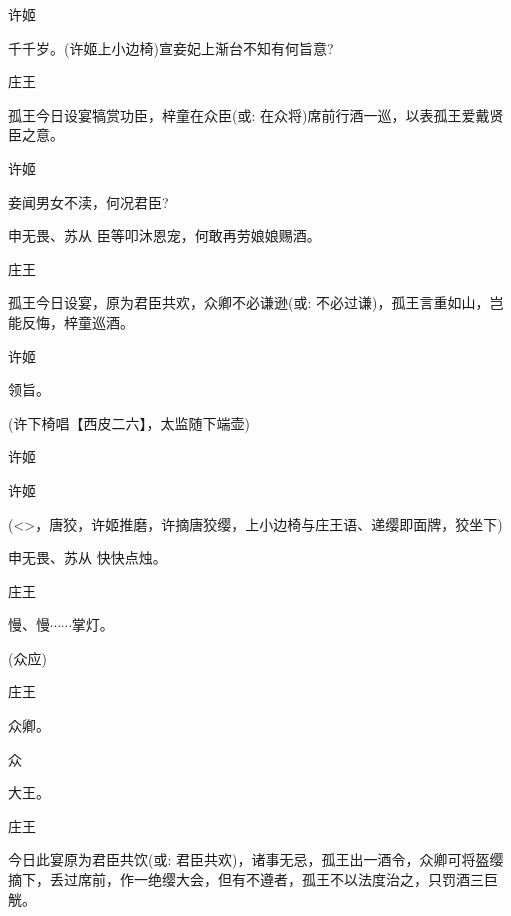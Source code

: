 {许姬\hspace{30pt}~

千千岁。(许姬上小边椅)宣妾妃上渐台不知有何旨意?

庄王

孤王今日设宴犒赏功臣，梓童在众臣({\akai 或}: 在众将)席前行酒一巡，以表孤王爱戴贤臣之意。

许姬\hspace{30pt}~

妾闻男女不渎，何况君臣?

申无畏、苏从 臣等叩沐恩宠，何敢再劳娘娘赐酒。

庄王

孤王今日设宴，原为君臣共欢，众卿不必谦逊({\akai 或}: 不必过谦)，孤王言重如山，岂能反悔，梓童巡酒。

许姬\hspace{30pt}~

领旨。

(许下椅唱【{\akai 西皮二六}】，太监随下端壶)

许姬


许姬\hspace{30pt}~


(\textless{}\!\textgreater{}，唐狡，许姬推磨，许摘唐狡缨，上小边椅与庄王语、递缨即面牌，狡坐下)

申无畏、苏从 快快点烛。

庄王\hspace{30pt}~

慢、慢$\cdots{}\cdots{}$掌灯。

(众应)

庄王\hspace{30pt}~

众卿。

众\hspace{40pt}~

大王。

庄王

今日此宴原为君臣共饮({\akai 或}: 君臣共欢)，诸事无忌，孤王出一酒令，众卿可将盔缨摘下，丢过席前，作一绝缨大会，但有不遵者，孤王不以法度治之，只罚酒三巨觥。

}
